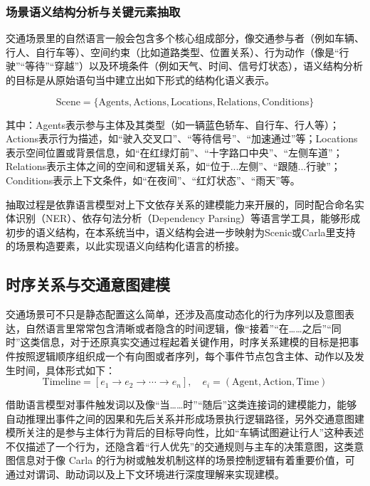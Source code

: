 \subsubsection{场景语义结构分析与关键元素抽取}

交通场景里的自然语言一般会包含多个核心组成部分，像交通参与者（例如车辆、行人、自行车等）、空间约束（比如道路类型、位置关系）、行为动作（像是“行驶”“等待”“穿越”）以及环境条件（例如天气、时间、信号灯状态），语义结构分析的目标是从原始语句当中建立出如下形式的结构化语义表示。

\begin{equation}
	\text{Scene} = \{ \text{Agents}, \text{Actions}, \text{Locations}, \text{Relations}, \text{Conditions} \}
\end{equation}

其中：Agents表示参与主体及其类型（如一辆蓝色轿车、自行车、行人等）；Actions表示行为描述，如“驶入交叉口”、“等待信号”、“加速通过”等；Locations表示空间位置或背景信息，如“在红绿灯前”、“十字路口中央”、“左侧车道”；Relations表示主体之间的空间和逻辑关系，如“位于...左侧”、“跟随...行驶”；Conditions表示上下文条件，如“在夜间”、“红灯状态”、“雨天”等。


抽取过程是依靠语言模型对上下文依存关系的建模能力来开展的，同时配合命名实体识别（NER）、依存句法分析（Dependency Parsing）等语言学工具，能够形成初步的语义结构，在本系统当中，语义结构会进一步映射为Scenic或Carla里支持的场景构造要素，以此实现语义向结构化语言的桥接。

\subsection{时序关系与交通意图建模}

交通场景可不只是静态配置这么简单，还涉及高度动态化的行为序列以及意图表达，自然语言里常常包含清晰或者隐含的时间逻辑，像“接着”“在……之后”“同时”这类信息，对于还原真实交通过程起着关键作用，时序关系建模的目标是把事件按照逻辑顺序组织成一个有向图或者序列，每个事件节点包含主体、动作以及发生时间，具体形式如下：
\begin{equation}
	\text{Timeline} = \left[ e_1 \rightarrow e_2 \rightarrow \cdots \rightarrow e_n \right], \quad e_i = (\text{Agent}, \text{Action}, \text{Time})
\end{equation}

借助语言模型对事件触发词以及像“当……时”“随后”这类连接词的建模能力，能够自动推理出事件之间的因果和先后关系并形成场景执行逻辑路径，另外交通意图建模所关注的是参与主体行为背后的目标导向性，比如“车辆试图避让行人”这种表述不仅描述了一个行为，还隐含着“行人优先”的交通规则与主车的决策意图，这类意图信息对于像 Carla 的行为树或触发机制这样的场景控制逻辑有着重要价值，可通过对谓词、助动词以及上下文环境进行深度理解来实现建模。


